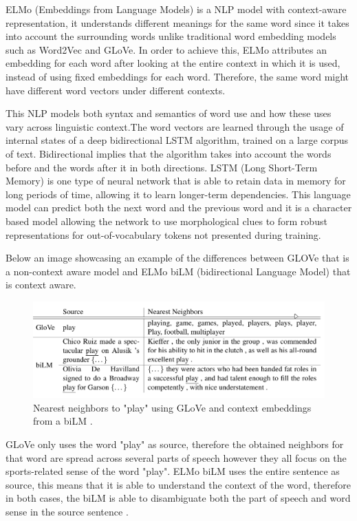             \par ELMo (Embeddings from Language Models) is a NLP model with context-aware representation, it understands different meanings for the same word since it takes into account the surrounding words unlike traditional word embedding models such as Word2Vec and GLoVe. In order to achieve this, ELMo attributes an embedding for each word after looking at the entire context in which it is used, instead of using fixed embeddings for each word. Therefore, the same word might have different word vectors under different contexts.
            \par This NLP models both syntax and semantics of word use and how these uses vary across linguistic context.The word vectors are learned through the usage of internal states of a deep bidirectional LSTM algorithm, trained on a large corpus of text. Bidirectional implies that the algorithm takes into account the words before and the words after it in both directions. LSTM (Long Short-Term Memory) is one type of neural network that is able to retain data in memory for long periods of time, allowing it to learn longer-term dependencies.
            This language model can predict both the next word and the previous word and it is a character based model allowing the network to use morphological clues to form robust representations for out-of-vocabulary tokens not presented during training.  \cite{Peters:2018}
            \par Below an image showcasing an example of the differences between GLOVe that is a non-context aware model and ELMo biLM (bidirectional Language Model) that is context aware.

            
        \begin{figure}[htb]
            \centering
            \includegraphics[scale = 0.3]{Sections/3StateOfTheArt/3_images/ELMO.png}
            \caption{Nearest neighbors to "play" using GLoVe and context embeddings from a biLM \cite{Peters:2018}.} 
        \end{figure}

        \par GLoVe only uses the word "play" as source, therefore the obtained neighbors for that word are spread across several parts of speech however they all focus on the sports-related sense of the word "play". ELMo biLM uses the entire sentence as source, this means that it is able to understand the context of the word, therefore in both cases, the biLM is able to disambiguate both the part of speech and word sense in the source sentence \cite{Peters:2018}.
        

